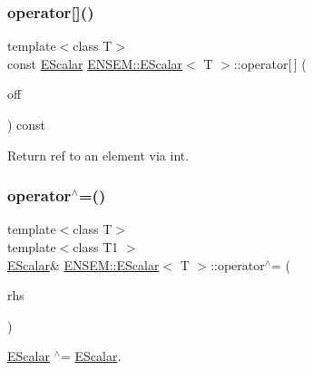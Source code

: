 \subsubsection{\texorpdfstring{operator[]()}{operator[]()}\hspace{0.1cm}{\footnotesize\ttfamily [3/3]}}
{\footnotesize\ttfamily template$<$class T$>$ \\
const \mbox{\hyperlink{classENSEM_1_1EScalar}{E\+Scalar}} \mbox{\hyperlink{classENSEM_1_1EScalar}{E\+N\+S\+E\+M\+::\+E\+Scalar}}$<$ T $>$\+::operator\mbox{[}$\,$\mbox{]} (\begin{DoxyParamCaption}\item[{int}]{off }\end{DoxyParamCaption}) const\hspace{0.3cm}{\ttfamily [inline]}}



Return ref to an element via int. 

\mbox{\label{classENSEM_1_1EScalar_a42c2a63d2eda81643ae8145068db3a8e}} 
\subsubsection{\texorpdfstring{operator$^\wedge$=()}{operator^=()}\hspace{0.1cm}{\footnotesize\ttfamily [1/3]}}
{\footnotesize\ttfamily template$<$class T$>$ \\
template$<$class T1 $>$ \\
\mbox{\hyperlink{classENSEM_1_1EScalar}{E\+Scalar}}\& \mbox{\hyperlink{classENSEM_1_1EScalar}{E\+N\+S\+E\+M\+::\+E\+Scalar}}$<$ T $>$\+::operator$^\wedge$= (\begin{DoxyParamCaption}\item[{const \mbox{\hyperlink{classENSEM_1_1EScalar}{E\+Scalar}}$<$ T1 $>$ \&}]{rhs }\end{DoxyParamCaption})\hspace{0.3cm}{\ttfamily [inline]}}



\mbox{\hyperlink{classENSEM_1_1EScalar}{E\+Scalar}} $^\wedge$= \mbox{\hyperlink{classENSEM_1_1EScalar}{E\+Scalar}}. 

